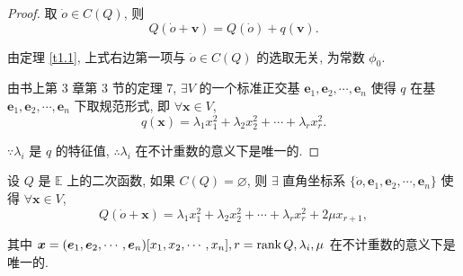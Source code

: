 \documentclass{ctexart}
\begin{document}
\begin{proof}
    取 $\dot{o}\in C(Q)$, 则
    \[Q(\dot{o}+\boldsymbol{v})=Q(\dot{o})+q(\boldsymbol{v}).\]

    由定理 \ref{t1.1}, 上式右边第一项与 $\dot{o}\in C(Q)$ 的选取无关, 为常数 $\phi_0$.

    由书上第 3 章第 3 节的定理 7, $\exists V$ 的一个标准正交基 $\boldsymbol{e}_1,\boldsymbol{e}_2,\cdots,\boldsymbol{e}_n$ 使得 $q$ 在基 $\boldsymbol{e}_1,\boldsymbol{e}_2,\cdots,\boldsymbol{e}_n$ 下取规范形式, 即 $\forall\boldsymbol{x}\in V$,
    \[q(\boldsymbol{x})=\lambda_1x^2_1+\lambda_2x^2_2+\cdots+\lambda_rx^2_r.\]

    $\because\lambda_i$ 是 $q$ 的特征值, $\therefore\lambda_i$ 在不计重数的意义下是唯一的.
\end{proof}
\begin{theorem}
    设 $Q$ 是 $\mathbb{E}$ 上的二次函数, 如果 $C(Q)=\varnothing$, 则 $\exists$ 直角坐标系 $\{\dot{o},\boldsymbol{e}_1,\boldsymbol{e}_2,\cdots,\boldsymbol{e}_n\}$ 使得 $\forall\boldsymbol{x}\in V$,
    \[Q(\dot{o}+\boldsymbol{x})=\lambda_1x^2_1+\lambda_2x^2_2+\cdots+\lambda_rx^2_r+2\mu x_{r+1},\]

    其中 $\boldsymbol{x}=(\boldsymbol{e}_1,\boldsymbol{e}_2,\cdots,\boldsymbol{e}_n)[x_1,x_2,\cdots,x_n],r=\operatorname{rank} Q,\lambda_i,\mu$ 在不计重数的意义下是唯一的.
\end{theorem}
\end{document}
